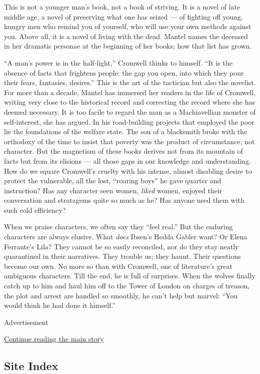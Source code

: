 This is not a younger man's book, not a book of striving. It is a novel
of late middle age, a novel of preserving what one has seized --- of
fighting off young, hungry men who remind you of yourself, who will use
your own methods against you. Above all, it is a novel of living with
the dead. Mantel names the deceased in her dramatis personae at the
beginning of her books; how that list has grown.

``A man's power is in the half-light,'' Cromwell thinks to himself. ``It
is the absence of facts that frightens people: the gap you open, into
which they pour their fears, fantasies, desires.'' This is the art of
the tactician but also the novelist. For more than a decade, Mantel has
immersed her readers in the life of Cromwell, writing very close to the
historical record and correcting the record where she has deemed
necessary. It is too facile to regard the man as a Machiavellian monster
of self-interest, she has argued. In his road-building projects that
employed the poor lie the foundations of the welfare state. The son of a
blacksmith broke with the orthodoxy of the time to insist that poverty
was the product of circumstance, not character. But the magnetism of
these books derives not from its mountain of facts but from its elisions
--- all those gaps in our knowledge and understanding. How do we square
Cromwell's cruelty with his intense, almost disabling desire to protect
the vulnerable, all the lost, ``roaring boys'' he gave quarter and
instruction? Has any character seen women, \emph{liked} women, enjoyed
their conversation and stratagems quite so much as he? Has anyone used
them with such cold efficiency?

When we praise characters, we often say they ``feel real.'' But the
enduring characters are always elusive. What \emph{does} Ibsen's Hedda
Gabler want? Or Elena Ferrante's Lila? They cannot be so easily
reconciled, nor do they stay neatly quarantined in their narratives.
They trouble us; they haunt. Their questions become our own. No more so
than with Cromwell, one of literature's great ambiguous characters. Till
the end, he is full of surprises. When the wolves finally catch up to
him and haul him off to the Tower of London on charges of treason, the
plot and arrest are handled so smoothly, he can't help but marvel: ``You
would think he had done it himself.''

Advertisement

\protect\hyperlink{after-bottom}{Continue reading the main story}

\hypertarget{site-index}{%
\subsection{Site Index}\label{site-index}}

